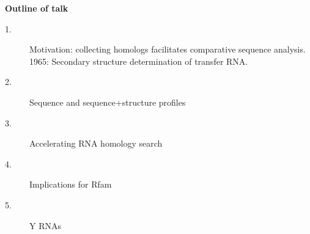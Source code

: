 \documentclass[landscape]{slides}
\begin{document}
\begin{slide}
\begin{center}
\textbf{Outline of talk}

\small
\begin{description}
\item[1.] Motivation: collecting homologs facilitates comparative
  sequence analysis.\\ 1965: Secondary structure determination of
  transfer RNA.
\item[2.] Sequence and sequence+structure profiles
\item[3.] Accelerating RNA homology search
\item[4.] Implications for Rfam
\item[5.] Y RNAs
\end{description}

\end{center}
\vfill
\end{slide}
\begin{slide}
\end{slide}
\end{document}
